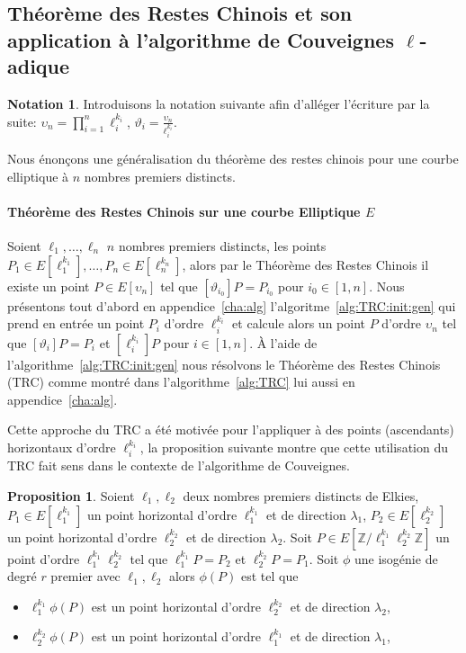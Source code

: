 \documentclass[10pt,a4paper]{book}
\theoremstyle{plain}
\theoremstyle{definition}
\theoremstyle{definition}
\theoremstyle{definition}
\theoremstyle{definition}
\newtheorem{prop}[thm]{Proposition}
\theoremstyle{definition}
\theoremstyle{remark}
\theoremstyle{remark}
\theoremstyle{definition}
\newtheorem{nota}[thm]{Notation}
\begin{document}
\subsection{Théorème des Restes Chinois et son application à l'algorithme de Couveignes $\ell$-adique}
\label{sub:TRCE:cou}


\begin{nota}
Introduisons la notation suivante afin d'alléger l'écriture par la suite: 
$\upsilon_n=\prod_{i=1}^n \ell_i^{k_i}$, 
$\vartheta_i=\frac{\upsilon_n}{\ell_i^{k_i}}$.
\end{nota}

Nous énonçons une généralisation du théorème des restes chinois pour une courbe 
elliptique à $n$ nombres premiers distincts.

\paragraph{Théorème des Restes Chinois sur une courbe Elliptique $E$}
{Soient $\ell_1, \dots, \ell_n$ $n$ nombres premiers distincts, les points $P_1 
\in E[\ell_1^{k_1}], \dots, P_n \in E[\ell_n^{k_n}]$, alors par le Théorème des
Restes Chinois il existe un point $P \in E[\upsilon_n]$ tel que 
$[\vartheta_{i_0}] P=P_{i_0}$ pour $i_0 \in [1,n]$.}
\newline
Nous présentons tout d'abord en appendice~\ref{cha:alg} 
l'algoritme~\ref{alg:TRC:init:gen} qui prend en entrée un point $P_{i}$ d'ordre
$\ell_{i}^{k_{i}}$ et calcule alors un point $P$ d'ordre 
$\upsilon_n$ tel que $[\vartheta_{i}]P=P_{i}$ et $[\ell_{i}^{k_{i}}]P$ pour 
$i \in [1,n]$. \`A l'aide de l'algorithme~\ref{alg:TRC:init:gen} nous résolvons
le Théorème des Restes Chinois (TRC) comme montré dans l'algorithme~\ref{alg:TRC} lui
aussi en appendice~\ref{cha:alg}.

Cette approche du TRC a été motivée pour l'appliquer à 
des points (ascendants) horizontaux d'ordre $\ell_i^{k_i}$, la proposition 
suivante montre que cette utilisation du TRC fait sens 
dans le contexte de l'algorithme de Couveignes.

\begin{prop}
\label{pro:par:TRC}
Soient $\ell_1, \ell_2$ deux nombres premiers distincts de Elkies, 
$P_1 \in E[\ell_1^{k_1}]$ un point horizontal d'ordre 
$\ell_1^{k_1}$ et de direction $\lambda_1$, $P_2 \in E[\ell_2^{k_2}]$ un point 
horizontal d'ordre $\ell_2^{k_2}$ et de direction $\lambda_2$. Soit $P \in 
E[\mathbb{Z}/\ell_1^{k_1}\ell_2^{k_2}\mathbb{Z}]$ un point d'ordre 
$\ell_1^{k_1}\ell_2^{k_2}$ tel que $\ell_1^{k_1}P=P_2$ et $\ell_2^{k_2}P=P_1$.
Soit $\phi$ une isogénie de degré $r$ premier avec $\ell_1, \ell_2$ alors 
$\phi(P)$ est tel que
\begin{itemize}
\item $\ell_1^{k_1}\phi(P)$ est un point horizontal d'ordre 
$\ell_2^{k_2}$ et de direction $\lambda_2$,  
\item $\ell_2^{k_2}\phi(P)$ est un point horizontal d'ordre 
$\ell_1^{k_1}$ et de direction $\lambda_1$,
\end{itemize}
\end{prop}
\end{document}
